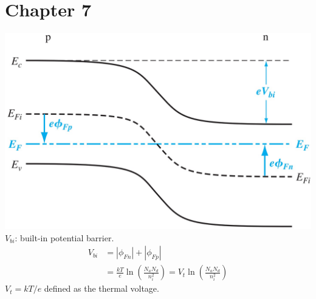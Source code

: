 \documentclass[a4paper, twocolumn]{article}
\begin{document}
\section{Chapter 7}
        \includegraphics[width=0.6\linewidth]{pn-junction-energy-band-diagram.jpg} \\
    $V_{bi}$: built-in potential barrier.
    \begin{equation*}
        \begin{aligned}
            V_{bi} &= |\phi_{Fn}| + |\phi_{Fp}| \\
            &= \frac{kT}{e} \ln \left( \frac{N_a N_d}{n_i^2}  \right) = V_t \ln\left( \frac{N_a N_d}{n_i^2}  \right)
        \end{aligned}
    \end{equation*}
    $V_t = kT / e$ defined as the thermal voltage.
\end{document}
